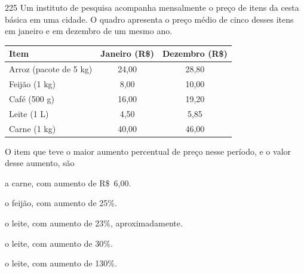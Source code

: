 \begin{questaoinedita}{2}{25}
Um instituto de pesquisa acompanha mensalmente o preço de itens da cesta
básica em uma cidade. O quadro apresenta o preço médio de cinco desses itens
em janeiro e em dezembro de um mesmo ano.

\begin{center}
\small
\begin{tabular}{lcc}
\toprule
\textbf{Item} & \textbf{Janeiro (R\$)} & \textbf{Dezembro (R\$)}\\
\midrule
Arroz (pacote de 5 kg) & 24,00 & 28,80\\
Feijão (1 kg) & 8,00 & 10,00\\
Café (500 g) & 16,00 & 19,20\\
Leite (1 L) & 4,50 & 5,85\\
Carne (1 kg) & 40,00 & 46,00\\
\bottomrule
\end{tabular}
\end{center}

O item que teve o maior aumento percentual de preço nesse período, e o valor
desse aumento, são
\begin{alternativas}
  \item a carne, com aumento de R\$~6,00.
  \item o feijão, com aumento de 25\%.
  \item o leite, com aumento de 23\%, aproximadamente.
  \item o leite, com aumento de 30\%.
  \item o leite, com aumento de 130\%.
\end{alternativas}
\end{questaoinedita}
